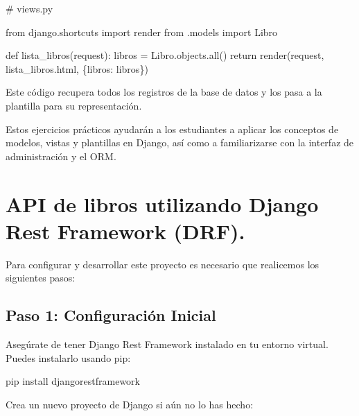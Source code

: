 \documentclass[
  a4paper,
  DIV=11,
  numbers=noendperiod,
  onepage,
  openany]{scrreprt}
\newenvironment{Shaded}{\begin{snugshade}}{\end{snugshade}}
\newcommand{\BuiltInTok}[1]{\textcolor[rgb]{0.00,0.23,0.31}{#1}}
\newcommand{\CommentTok}[1]{\textcolor[rgb]{0.37,0.37,0.37}{#1}}
\newcommand{\ControlFlowTok}[1]{\textcolor[rgb]{0.00,0.23,0.31}{#1}}
\newcommand{\ExtensionTok}[1]{\textcolor[rgb]{0.00,0.23,0.31}{#1}}
\newcommand{\ImportTok}[1]{\textcolor[rgb]{0.00,0.46,0.62}{#1}}
\newcommand{\KeywordTok}[1]{\textcolor[rgb]{0.00,0.23,0.31}{#1}}
\newcommand{\NormalTok}[1]{\textcolor[rgb]{0.00,0.23,0.31}{#1}}
\newcommand{\OperatorTok}[1]{\textcolor[rgb]{0.37,0.37,0.37}{#1}}
\newcommand{\StringTok}[1]{\textcolor[rgb]{0.13,0.47,0.30}{#1}}
\begin{document}
\begin{Shaded}
\begin{Highlighting}[]
\CommentTok{\# views.py}

\ImportTok{from}\NormalTok{ django.shortcuts }\ImportTok{import}\NormalTok{ render}
\ImportTok{from}\NormalTok{ .models }\ImportTok{import}\NormalTok{ Libro}

\KeywordTok{def}\NormalTok{ lista\_libros(request):}
\NormalTok{    libros }\OperatorTok{=}\NormalTok{ Libro.objects.}\BuiltInTok{all}\NormalTok{()}
    \ControlFlowTok{return}\NormalTok{ render(request, }\StringTok{\textquotesingle{}lista\_libros.html\textquotesingle{}}\NormalTok{, \{}\StringTok{\textquotesingle{}libros\textquotesingle{}}\NormalTok{: libros\})}
\end{Highlighting}
\end{Shaded}

Este código recupera todos los registros de la base de datos y los pasa
a la plantilla para su representación.

Estos ejercicios prácticos ayudarán a los estudiantes a aplicar los
conceptos de modelos, vistas y plantillas en Django, así como a
familiarizarse con la interfaz de administración y el ORM.

\section{API de libros utilizando Django Rest Framework
(DRF).}\label{api-de-libros-utilizando-django-rest-framework-drf.}

Para configurar y desarrollar este proyecto es necesario que realicemos
los siguientes pasos:

\subsection{Paso 1: Configuración
Inicial}\label{paso-1-configuraciuxf3n-inicial}

Asegúrate de tener Django Rest Framework instalado en tu entorno
virtual. Puedes instalarlo usando pip:

\begin{Shaded}
\begin{Highlighting}[]
\ExtensionTok{pip}\NormalTok{ install djangorestframework}
\end{Highlighting}
\end{Shaded}

Crea un nuevo proyecto de Django si aún no lo has hecho:
\end{document}
